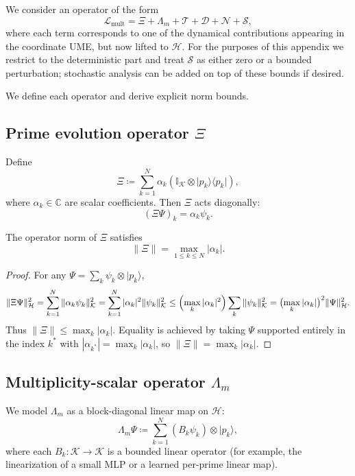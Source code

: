 \documentclass[11pt]{article}
\begin{document}
We consider an operator of the form
\begin{equation}
\mathcal{L}_{\mathrm{mult}}
=
\Xi + \Lambda_m + \mathcal{T} + \mathcal{D} + \mathcal{N} + \mathcal{S},
\label{eq:Lmult-decomp}
\end{equation}
where each term corresponds to one of the dynamical contributions appearing in the coordinate UME, but now lifted to \(\mathcal{H}\). For the purposes of this appendix we restrict to the deterministic part and treat \(\mathcal{S}\) as either zero or a bounded perturbation; stochastic analysis can be added on top of these bounds if desired.

We define each operator and derive explicit norm bounds.

\subsection{Prime evolution operator \(\Xi\)}

Define
\begin{equation}
\Xi
\coloneqq
\sum_{k=1}^N \alpha_k \left(\mathbb{I}_{\mathcal{K}} \otimes \lvert p_k\rangle\langle p_k\rvert\right),
\end{equation}
where \(\alpha_k \in \mathbb{C}\) are scalar coefficients. Then \(\Xi\) acts diagonally:
\[
(\Xi \Psi)_k = \alpha_k \psi_k.
\]

\begin{lemma}
\label{lem:Xi-norm}
The operator norm of \(\Xi\) satisfies
\[
\|\Xi\| = \max_{1\le k\le N} |\alpha_k|.
\]
\end{lemma}

\begin{proof}
For any \(\Psi = \sum_k \psi_k \otimes \lvert p_k\rangle\),
\[
\|\Xi \Psi\|_{\mathcal{H}}^2
=
\sum_{k=1}^N \|\alpha_k \psi_k\|_{\mathcal{K}}^2
=
\sum_{k=1}^N |\alpha_k|^2 \|\psi_k\|_{\mathcal{K}}^2
\le
\Bigl(\max_k |\alpha_k|^2\Bigr)\sum_k \|\psi_k\|_{\mathcal{K}}^2
=
\bigl(\max_k|\alpha_k|\bigr)^2 \|\Psi\|_{\mathcal{H}}^2.
\]
Thus \(\|\Xi\|\le \max_k|\alpha_k|\). Equality is achieved by taking \(\Psi\) supported entirely in the index \(k^\ast\) with \(|\alpha_{k^\ast}|=\max_k|\alpha_k|\), so \(\|\Xi\| = \max_k|\alpha_k|\).
\end{proof}

\subsection{Multiplicity-scalar operator \(\Lambda_m\)}

We model \(\Lambda_m\) as a block-diagonal linear map on \(\mathcal{H}\):
\begin{equation}
\Lambda_m \Psi
\coloneqq
\sum_{k=1}^N (B_k \psi_k)\otimes \lvert p_k\rangle,
\end{equation}
where each \(B_k:\mathcal{K}\to \mathcal{K}\) is a bounded linear operator (for example, the linearization of a small MLP or a learned per-prime linear map).
\end{document}

